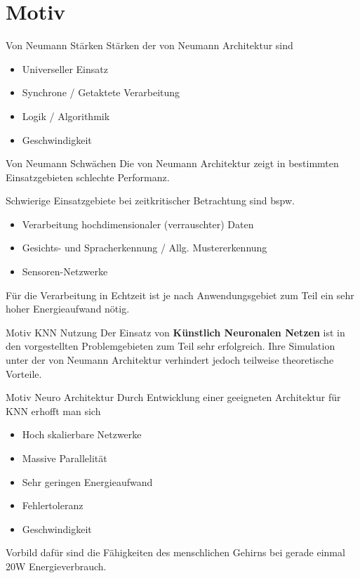 \section{Motiv}

\begin{slide}{Von Neumann Stärken}
	Stärken der von Neumann Architektur sind
	\begin{itemize}
		\item Universeller Einsatz
		\item Synchrone / Getaktete Verarbeitung
		\item Logik / Algorithmik
		\item Geschwindigkeit
	\end{itemize}
\end{slide}

\begin{slide}{Von Neumann Schwächen}
	Die von Neumann Architektur zeigt in bestimmten Einsatzgebieten schlechte Performanz.
	
	Schwierige Einsatzgebiete bei zeitkritischer Betrachtung sind bspw.
	\begin{itemize}
		\item Verarbeitung hochdimensionaler (verrauschter) Daten
		\item Gesichts- und Spracherkennung / Allg. Mustererkennung
		\item Sensoren-Netzwerke
	\end{itemize}
	
	Für die Verarbeitung in \alert{Echtzeit} ist je nach Anwendungsgebiet zum Teil ein sehr hoher Energieaufwand nötig.
\end{slide}

\begin{slide}{Motiv KNN Nutzung}
	Der Einsatz von \textbf{Künstlich Neuronalen Netzen} ist in den vorgestellten Problemgebieten zum Teil sehr erfolgreich. Ihre Simulation unter der von Neumann Architektur verhindert jedoch teilweise theoretische Vorteile.
\end{slide}

\begin{slide}{Motiv Neuro Architektur}
	Durch Entwicklung einer geeigneten Architektur für KNN erhofft man sich
	
	\begin{itemize}
		\item Hoch skalierbare Netzwerke
		\item Massive Parallelität
		\item Sehr geringen Energieaufwand
		\item Fehlertoleranz
		\item Geschwindigkeit
	\end{itemize}
	
	Vorbild dafür sind die Fähigkeiten des menschlichen Gehirns bei gerade einmal 20W Energieverbrauch.
\end{slide}

